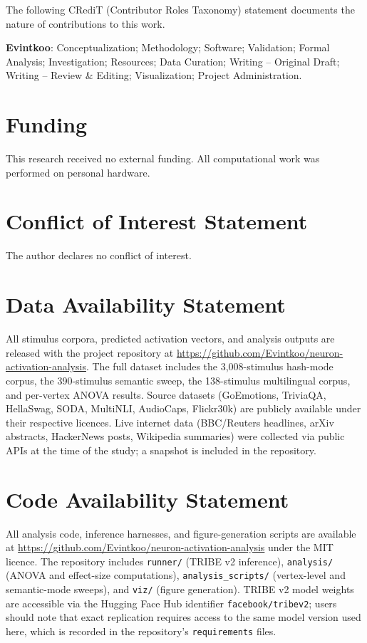 \documentclass[11pt,letterpaper]{article}
\numberwithin{equation}{section}
\begin{document}
The following CRediT (Contributor Roles Taxonomy) statement documents the nature of contributions to this work.

\noindent\textbf{Evintkoo}: Conceptualization; Methodology; Software; Validation; Formal Analysis; Investigation; Resources; Data Curation; Writing – Original Draft; Writing – Review \& Editing; Visualization; Project Administration.

\section*{Funding}

This research received no external funding. All computational work was performed on personal hardware.

\section*{Conflict of Interest Statement}

The author declares no conflict of interest.

\section*{Data Availability Statement}

All stimulus corpora, predicted activation vectors, and analysis outputs are released with the project repository at \url{https://github.com/Evintkoo/neuron-activation-analysis}. The full dataset includes the 3,008-stimulus hash-mode corpus, the 390-stimulus semantic sweep, the 138-stimulus multilingual corpus, and per-vertex ANOVA results. Source datasets (GoEmotions, TriviaQA, HellaSwag, SODA, MultiNLI, AudioCaps, Flickr30k) are publicly available under their respective licences. Live internet data (BBC/Reuters headlines, arXiv abstracts, HackerNews posts, Wikipedia summaries) were collected via public APIs at the time of the study; a snapshot is included in the repository.

\section*{Code Availability Statement}

All analysis code, inference harnesses, and figure-generation scripts are available at \url{https://github.com/Evintkoo/neuron-activation-analysis} under the MIT licence. The repository includes \texttt{runner/} (TRIBE v2 inference), \texttt{analysis/} (ANOVA and effect-size computations), \texttt{analysis\_scripts/} (vertex-level and semantic-mode sweeps), and \texttt{viz/} (figure generation). TRIBE v2 model weights are accessible via the Hugging Face Hub identifier \texttt{facebook/\allowbreak tribev2}; users should note that exact replication requires access to the same model version used here, which is recorded in the repository's \texttt{requirements} files.
\end{document}

